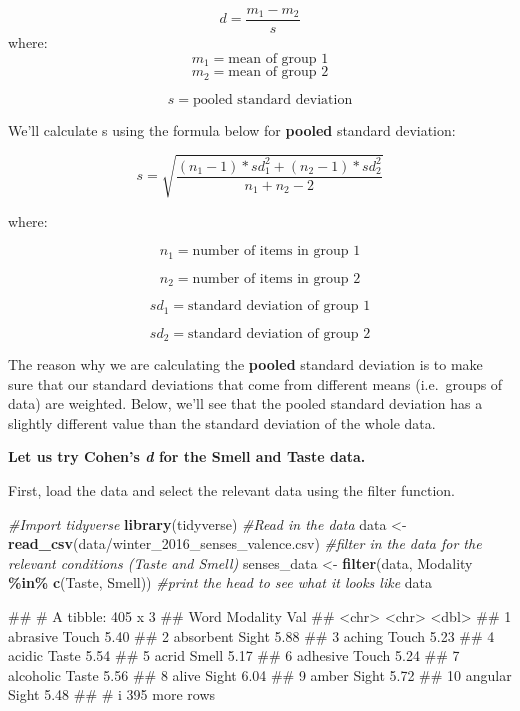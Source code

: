 \documentclass[
]{book}
\newenvironment{Shaded}{\begin{snugshade}}{\end{snugshade}}
\newcommand{\CommentTok}[1]{\textcolor[rgb]{0.56,0.35,0.01}{\textit{#1}}}
\newcommand{\FunctionTok}[1]{\textcolor[rgb]{0.13,0.29,0.53}{\textbf{#1}}}
\newcommand{\NormalTok}[1]{#1}
\newcommand{\OtherTok}[1]{\textcolor[rgb]{0.56,0.35,0.01}{#1}}
\newcommand{\SpecialCharTok}[1]{\textcolor[rgb]{0.81,0.36,0.00}{\textbf{#1}}}
\newcommand{\StringTok}[1]{\textcolor[rgb]{0.31,0.60,0.02}{#1}}
\begin{document}
\[d = \frac{m_1-m_2}{s}\]
where:
\[m_1 = \text{mean of group 1}\]
\[m_2 = \text{mean of group 2}\]

\[s = \text{pooled standard deviation}\]

We'll calculate s using the formula below for \textbf{pooled} standard deviation:

\[s = \sqrt{\frac{(n_1-1)*sd_1^2 + (n_2-1)*sd_2^2}{n_1+n_2-2}}\]

where:

\[n_1 = \text{number of items in group 1}\]

\[n_2 = \text{number of items in group 2}\]

\[sd_1 = \text{standard deviation of group 1}\]

\[sd_2 = \text{standard deviation of group 2}\]

The reason why we are calculating the \textbf{pooled} standard deviation is to make sure that our standard deviations that come from different means (i.e.~groups of data) are weighted. Below, we'll see that the pooled standard deviation has a slightly different value than the standard deviation of the whole data.

\textbf{Let us try Cohen's \emph{d} for the Smell and Taste data. }

First, load the data and select the relevant data using the filter function.

\begin{Shaded}
\begin{Highlighting}[]
\CommentTok{\#Import tidyverse}
\FunctionTok{library}\NormalTok{(tidyverse)}
\CommentTok{\#Read in the data}
\NormalTok{data }\OtherTok{\textless{}{-}} \FunctionTok{read\_csv}\NormalTok{(}\StringTok{\textquotesingle{}data/winter\_2016\_senses\_valence.csv\textquotesingle{}}\NormalTok{)}
\CommentTok{\#filter in the data for the relevant conditions (Taste and Smell)}
\NormalTok{senses\_data }\OtherTok{\textless{}{-}} \FunctionTok{filter}\NormalTok{(data, Modality }\SpecialCharTok{\%in\%} \FunctionTok{c}\NormalTok{(}\StringTok{\textquotesingle{}Taste\textquotesingle{}}\NormalTok{, }\StringTok{\textquotesingle{}Smell\textquotesingle{}}\NormalTok{))}
\CommentTok{\#print the head to see what it looks like}
\NormalTok{data}
\end{Highlighting}
\end{Shaded}

\begin{Shaded}
\begin{Highlighting}[]
\NormalTok{\#\# \# A tibble: 405 x 3}
\NormalTok{\#\#    Word      Modality   Val}
\NormalTok{\#\#    \textless{}chr\textgreater{}     \textless{}chr\textgreater{}    \textless{}dbl\textgreater{}}
\NormalTok{\#\#  1 abrasive  Touch     5.40}
\NormalTok{\#\#  2 absorbent Sight     5.88}
\NormalTok{\#\#  3 aching    Touch     5.23}
\NormalTok{\#\#  4 acidic    Taste     5.54}
\NormalTok{\#\#  5 acrid     Smell     5.17}
\NormalTok{\#\#  6 adhesive  Touch     5.24}
\NormalTok{\#\#  7 alcoholic Taste     5.56}
\NormalTok{\#\#  8 alive     Sight     6.04}
\NormalTok{\#\#  9 amber     Sight     5.72}
\NormalTok{\#\# 10 angular   Sight     5.48}
\NormalTok{\#\# \# i 395 more rows}
\end{Highlighting}
\end{Shaded}
\end{document}
